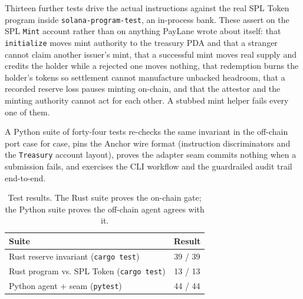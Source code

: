\documentclass[10pt,twocolumn]{article}
\begin{document}
Thirteen further tests drive the actual instructions against the real SPL Token
program inside \texttt{solana-program-test}, an in-process bank. These assert on
the SPL \texttt{Mint} account rather than on anything PayLane wrote about itself:
that \texttt{initialize} moves mint authority to the treasury PDA and that a
stranger cannot claim another issuer's mint, that a successful mint moves real
supply and credits the holder while a rejected one moves nothing, that redemption
burns the holder's tokens so settlement cannot manufacture unbacked headroom, that
a recorded reserve loss pauses minting on-chain, and that the attestor and the
minting authority cannot act for each other. A stubbed mint helper fails every one
of them.

A Python suite of forty-four tests re-checks the same invariant in the off-chain
port case for case, pins the Anchor wire format (instruction discriminators and the
\texttt{Treasury} account layout), proves the adapter seam commits nothing when a
submission fails, and exercises the CLI workflow and the guardrailed audit trail
end-to-end.

\begin{table}[h]
\centering
\begin{tabular}{lc}
\toprule
\textbf{Suite} & \textbf{Result} \\
\midrule
Rust reserve invariant (\texttt{cargo test}) & 39 / 39 \\
Rust program vs. SPL Token (\texttt{cargo test}) & 13 / 13 \\
Python agent + seam (\texttt{pytest}) & 44 / 44 \\
\bottomrule
\end{tabular}
\caption{Test results. The Rust suite proves the on-chain gate; the Python suite
proves the off-chain agent agrees with it.}
\end{table}
\end{document}
